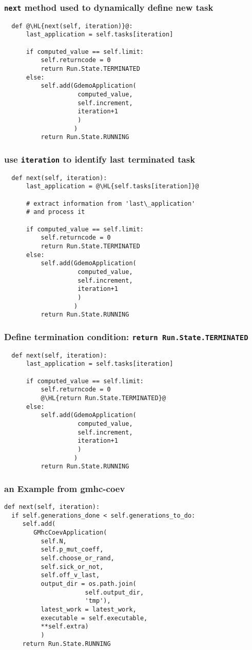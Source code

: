 \documentclass[english,serif,mathserif,xcolor=pdftex,dvipsnames,table]{beamer}
\begin{document}
\begin{frame}[fragile]
\frametitle{\texttt{next} method used to dynamically define new task}
  \begin{lstlisting}
  def @\HL{next(self, iteration)}@:
      last_application = self.tasks[iteration]

      if computed_value == self.limit:
          self.returncode = 0
          return Run.State.TERMINATED
      else:
          self.add(GdemoApplication(
                    computed_value, 
                    self.increment, 
                    iteration+1
                    )
                   )
          return Run.State.RUNNING
  \end{lstlisting}
\end{frame}

\begin{frame}[fragile]
\frametitle{use \texttt{iteration} to identify last terminated task}
  \begin{lstlisting}
  def next(self, iteration):
      last_application = @\HL{self.tasks[iteration]}@

      # extract information from 'last\_application'
      # and process it

      if computed_value == self.limit:
          self.returncode = 0
          return Run.State.TERMINATED
      else:
          self.add(GdemoApplication(
                    computed_value, 
                    self.increment, 
                    iteration+1
                    )
                   )
          return Run.State.RUNNING
  \end{lstlisting}
\end{frame}

\begin{frame}[fragile]
 \frametitle{Define termination condition: \texttt{return Run.State.TERMINATED}}
 \begin{lstlisting}
  def next(self, iteration):
      last_application = self.tasks[iteration]

      if computed_value == self.limit:
          self.returncode = 0
          @\HL{return Run.State.TERMINATED}@
      else:
          self.add(GdemoApplication(
                    computed_value, 
                    self.increment, 
                    iteration+1
                    )
                   )
          return Run.State.RUNNING
  \end{lstlisting}
\end{frame}

\begin{frame}[fragile]
  \frametitle{an Example from gmhc-coev}
 \begin{lstlisting}
def next(self, iteration):
  if self.generations_done < self.generations_to_do:
     self.add(
        GMhcCoevApplication(
          self.N, 
          self.p_mut_coeff, 
          self.choose_or_rand, 
          self.sick_or_not, 
          self.off_v_last,
          output_dir = os.path.join(
                      self.output_dir, 
                      'tmp'),
          latest_work = latest_work,
          executable = self.executable,
          **self.extra)
          )
     return Run.State.RUNNING
  \end{lstlisting}
\end{frame}
\end{document}
